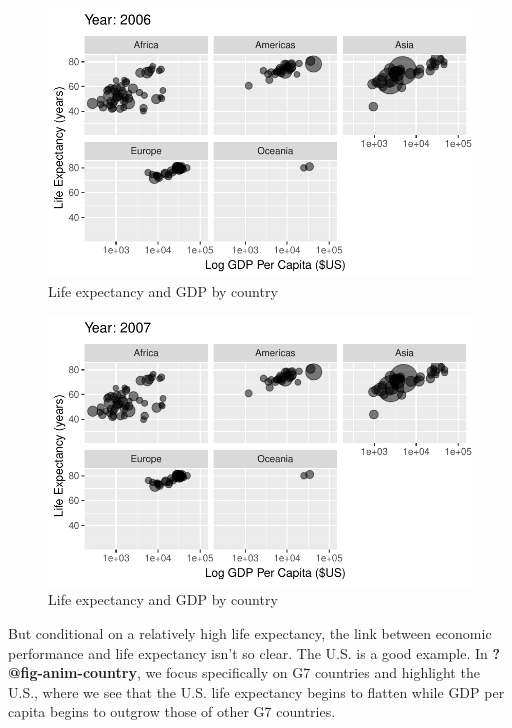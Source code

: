 \documentclass[
  letterpaper,
  DIV=11,
  numbers=noendperiod]{scrreport}
\theoremstyle{definition}
\theoremstyle{remark}
\begin{document}
\begin{figure}

{\centering \includegraphics{index_files/figure-pdf/fig-anim-lifegdp-99.pdf}

}

\caption{\label{fig-anim-lifegdp-99}Life expectancy and GDP by country}

\end{figure}

\begin{figure}

{\centering \includegraphics{index_files/figure-pdf/fig-anim-lifegdp-100.pdf}

}

\caption{\label{fig-anim-lifegdp-100}Life expectancy and GDP by country}

\end{figure}

But conditional on a relatively high life expectancy, the link between
economic performance and life expectancy isn't so clear. The U.S. is a
good example. In \textbf{?@fig-anim-country}, we focus specifically on
G7 countries and highlight the U.S., where we see that the U.S. life
expectancy begins to flatten while GDP per capita begins to outgrow
those of other G7 countries.
\end{document}
